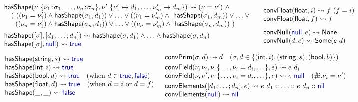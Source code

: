 \documentclass[10pt,preprint,clearpagebib]{sigplanconf}
\newcommand{\kvd}[1]{\textnormal{\textcolor{kvdclr}{\sffamily #1}}}
\newcommand{\ident}[1]{\textnormal{\sffamily #1}}
\newcommand{\reduce}{\rightsquigarrow}
\begin{document}
\begin{figure}
\noindent
\begin{equation*}
\hspace{1.1em}
\begin{array}{l}
\ident{hasShape}(\nu~ \{ \nu_1 \!:\! \sigma_1, \ldots, \nu_n \!:\! \sigma_n \}, \nu'~\{ \nu'_1\mapsto d_1, \ldots, \nu'_m\mapsto d_m \}) \reduce (\nu = \nu') ~\wedge \\
  \quad (~ ((\nu_1 = \nu'_1) \wedge \ident{hasShape}(\sigma_1, d_1)) \vee\ldots\vee ((\nu_1 = \nu'_m) \wedge \ident{hasShape}(\sigma_1, d_m)) \vee \ldots \vee\\
  \quad ~\; ((\nu_n = \nu'_1) \wedge \ident{hasShape}(\sigma_n, d_1)) \vee\ldots\vee ((\nu_n = \nu'_m) \wedge \ident{hasShape}(\sigma_n, d_m))~)
\\[0.5em]
\ident{hasShape}([\sigma], [d_1; \ldots; d_n]) \reduce \ident{hasShape}(\sigma, d_1)\wedge\ldots\wedge\ident{hasShape}(\sigma, d_n) \\
\ident{hasShape}([\sigma], \kvd{null}) \reduce \kvd{true} 
\end{array}  
\quad
\begin{array}{l}
\ident{convFloat}(\ident{float}, i) \reduce f~(f=i) \\
\ident{convFloat}(\ident{float}, f) \reduce f \\[0.75em]
\ident{convNull}(\kvd{null}, e) \reduce \ident{None} \\
\ident{convNull}(d, e) \reduce \ident{Some}(e~d) 
\end{array}
\end{equation*}
%
\vspace{-0.75em}
%
\begin{equation*}
\begin{array}{l}
\ident{hasShape}(\ident{string}, s) \reduce \kvd{true} \\
\ident{hasShape}(\ident{int}, i) \reduce \kvd{true}\\
\ident{hasShape}(\ident{bool}, d) \reduce \kvd{true} \quad(\textnormal{when}~d\in{\kvd{true},\kvd{false}} )\\
\ident{hasShape}(\ident{float}, d) \reduce \kvd{true} \quad(\textnormal{when}~d=i ~\textnormal{or}~ d=f) \\
\ident{hasShape}(\_, \_) \reduce \kvd{false} \\
\end{array}
\;\;
\begin{array}{l}
\ident{convPrim}(\sigma, d) \reduce d\quad(\sigma,d\in\{ (\ident{int},i),(\ident{string},s),(\ident{bool}, b) \})
\\[0.25em]
\ident{convField}(\nu,\nu_i, \nu~\{\ldots, \nu_i=d_i, \ldots\}, e) \reduce e~d_i\\
\ident{convField}(\nu,\nu', \nu~\{\ldots, \nu_i=d_i, \ldots\}, e) \reduce e~\kvd{null}\quad(\nexists i.\nu_i=\nu' )
\\[0.25em]
\ident{convElements}([d_1; \ldots; d_n], e) \reduce e~d_1 :: \ldots :: e~d_n :: \kvd{nil}  \\  
\ident{convElements}(\kvd{null}) \reduce \kvd{nil}
\end{array}
\end{equation*}


\end{figure}
\end{document}
